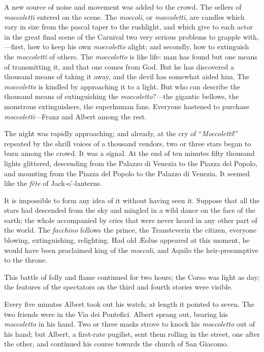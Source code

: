 A new source of noise and movement was added to the crowd. The sellers
of \textit{moccoletti} entered on the scene. The \textit{moccoli}, or \textit{moccoletti},
are candles which vary in size from the pascal taper to the rushlight,
and which give to each actor in the great final scene of the Carnival
two very serious problems to grapple with,—first, how to keep his own
\textit{moccoletto} alight; and secondly, how to extinguish the \textit{moccoletti}
of others. The \textit{moccoletto} is like life: man has found but one means
of transmitting it, and that one comes from God. But he has discovered
a thousand means of taking it away, and the devil has somewhat aided
him. The \textit{moccoletto} is kindled by approaching it to a light. But who
can describe the thousand means of extinguishing the \textit{moccoletto}?—the
gigantic bellows, the monstrous extinguishers, the superhuman fans.
Everyone hastened to purchase \textit{moccoletti}—Franz and Albert among the
rest.

The night was rapidly approaching; and already, at the cry of
“\textit{Moccoletti}!” repeated by the shrill voices of a thousand vendors,
two or three stars began to burn among the crowd. It was a signal. At
the end of ten minutes fifty thousand lights glittered, descending from
the Palazzo di Venezia to the Piazza del Popolo, and mounting from the
Piazza del Popolo to the Palazzo di Venezia. It seemed like the \textit{fête}
of Jack-o’-lanterns.

It is impossible to form any idea of it without having seen it. Suppose
that all the stars had descended from the sky and mingled in a wild
dance on the face of the earth; the whole accompanied by cries that
were never heard in any other part of the world. The \textit{facchino} follows
the prince, the Transteverin the citizen, everyone blowing,
extinguishing, relighting. Had old Æolus appeared at this moment, he
would have been proclaimed king of the \textit{moccoli}, and Aquilo the
heir-presumptive to the throne.

This battle of folly and flame continued for two hours; the Corso was
light as day; the features of the spectators on the third and fourth
stories were visible.

Every five minutes Albert took out his watch; at length it pointed to
seven. The two friends were in the Via dei Pontefici. Albert sprang
out, bearing his \textit{moccoletto} in his hand. Two or three masks strove to
knock his \textit{moccoletto} out of his hand; but Albert, a first-rate
pugilist, sent them rolling in the street, one after the other, and
continued his course towards the church of San Giacomo.

